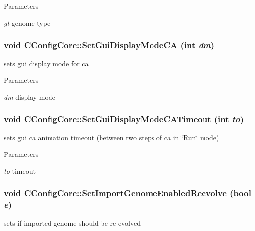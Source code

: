 \begin{DoxyParams}{Parameters}
\item[{\em gt}]genome type \end{DoxyParams}
\hypertarget{classCConfigCore_aad6d7e889c24a31f738357c5bb6c11f3}{
\subsubsection[{SetGuiDisplayModeCA}]{\setlength{\rightskip}{0pt plus 5cm}void CConfigCore::SetGuiDisplayModeCA (int {\em dm})}}
\label{classCConfigCore_aad6d7e889c24a31f738357c5bb6c11f3}
sets gui display mode for ca


\begin{DoxyParams}{Parameters}
\item[{\em dm}]display mode \end{DoxyParams}
\hypertarget{classCConfigCore_abf0b1f19353a1f0e205b1508754b6582}{
\subsubsection[{SetGuiDisplayModeCATimeout}]{\setlength{\rightskip}{0pt plus 5cm}void CConfigCore::SetGuiDisplayModeCATimeout (int {\em to})}}
\label{classCConfigCore_abf0b1f19353a1f0e205b1508754b6582}
sets gui ca animation timeout (between two steps of ca in \char`\"{}Run\char`\"{} mode)


\begin{DoxyParams}{Parameters}
\item[{\em to}]timeout \end{DoxyParams}
\hypertarget{classCConfigCore_ac73c74f5e53acd83f7b4272991abfe5e}{
\subsubsection[{SetImportGenomeEnabledReevolve}]{\setlength{\rightskip}{0pt plus 5cm}void CConfigCore::SetImportGenomeEnabledReevolve (bool {\em e})}}
\label{classCConfigCore_ac73c74f5e53acd83f7b4272991abfe5e}
sets if imported genome should be re-\/evolved


